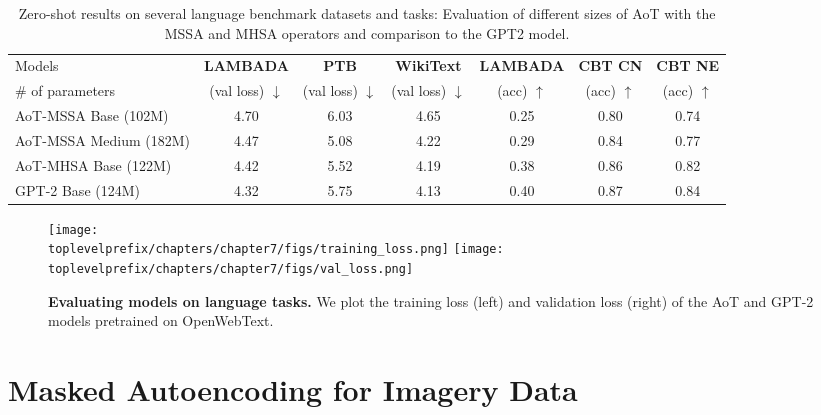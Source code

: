 \documentclass[../../book-main.tex]{subfiles}
\begin{document}
\begin{table*}[!htbp]
\caption{Zero-shot results on several language benchmark datasets and tasks: Evaluation of different sizes of AoT with the MSSA and MHSA operators and comparison to the GPT2 model.}\vskip 0.1in
\centering
\begin{small}
\begin{tabular}{l|cccccc}
\toprule
 Models  & {\bf LAMBADA} & {\bf PTB} & {\bf WikiText} & {\bf LAMBADA} & {\bf CBT CN} & {\bf CBT NE} \\
 \# of parameters  & (val loss) $\downarrow$ &  (val loss) $\downarrow$ &(val loss) $\downarrow$ & (acc) $\uparrow$ &(acc) $\uparrow$ &(acc) $\uparrow$ \\
 \midrule
 AoT-MSSA Base (102M) & 4.70 & 6.03 & 4.65 & 0.25 & 0.80 & 0.74\\
 AoT-MSSA Medium (182M) & 4.47 & 5.08 & 4.22 & 0.29 & 0.84 & 0.77 \\
 AoT-MHSA Base (122M) & 4.42 & 5.52 & 4.19 & 0.38 & 0.86 & 0.82\\
 GPT-2 Base (124M) & 4.32 & 5.75 & 4.13 &  0.40 &  0.87 &  0.84 \\
\bottomrule
\end{tabular}
\label{tab:zeroshot}
\end{small}
\end{table*} 
\vspace{-0.05in} 


\begin{figure*}[t]
\begin{center}
\texttt{[image: \\toplevelprefix/chapters/chapter7/figs/training\_loss.png]} \hspace{0.4in}
\texttt{[image: \\toplevelprefix/chapters/chapter7/figs/val\_loss.png]}
    \vspace{-0.15in}
\caption{\centering \textbf{Evaluating models on language tasks.} We plot the training loss (left) and validation loss (right) of the AoT and GPT-2 models pretrained on OpenWebText.}  \label{fig:loss} 
\end{center}
\vspace{-0.15in}
\end{figure*} 




 

\section{Masked Autoencoding for Imagery Data}\label{sec:image_completion}
\end{document}
